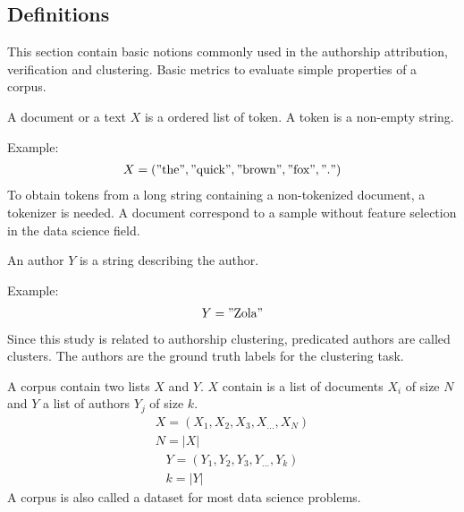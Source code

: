 \subsection{Definitions \label{sec:definitions}}

This section contain basic notions commonly used in the authorship attribution, verification and clustering.
Basic metrics to evaluate simple properties of a corpus.

\begin{definition}
  A document or a text $X$ is a ordered list of token.
  A token is a non-empty string.

  Example:
  \begin{gather*}
    X = ("\text{the}", "\text{quick}", "\text{brown}", "\text{fox}", "\text{.}")
  \end{gather*}
  To obtain tokens from a long string containing a non-tokenized document, a tokenizer is needed.
  A document correspond to a sample without feature selection in the data science field.
\end{definition}

\begin{definition}[Author]
  An author $Y$ is a string describing the author.

  Example:
  \begin{gather*}
    Y = "\text{Zola}"
  \end{gather*}
  Since this study is related to authorship clustering, predicated authors are called clusters.
  The authors are the ground truth labels for the clustering task.
\end{definition}

\begin{definition}[Corpus]
  A corpus contain two lists $X$ and $Y$.
  $X$ contain is a list of documents $X_i$ of size $N$ and $Y$ a list of authors $Y_j$ of size $k$.
  \begin{gather*}
    X = (X_1, X_2, X_3, X_{...}, X_N) \\
    N = |X|
  \end{gather*}
  \begin{gather*}
    Y = (Y_1, Y_2, Y_3, Y_{...}, Y_k) \\
    k = |Y|
  \end{gather*}
  A corpus is also called a dataset for most data science problems.
\end{definition}


